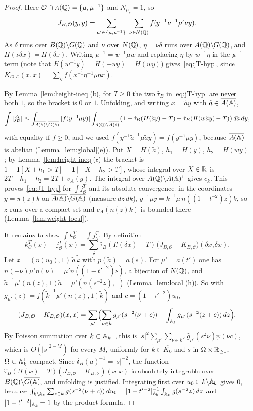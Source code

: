 \begin{proof}
Here $\mathcal O\cap A(\mathbb{Q})=\{\mu,\mu^{-1}\}$ and $N_{\mu_s}=1$, so
\[
J_{B,\mathcal O}(y,y)=\sum_{\mu'\in\{\mu,\mu^{-1}\}}\ \sum_{\nu\in N(\mathbb{Q})}
f(y^{-1}\nu^{-1}\mu'\nu y).
\] As $\delta$ runs over $B(\mathbb{Q})\backslash
G(\mathbb{Q})$ and $\nu$ over $N(\mathbb{Q})$, $\eta=\nu\delta$ runs over
$A(\mathbb{Q})\backslash G(\mathbb{Q})$, and $H(\nu\delta x)=H(\delta x)$. Writing
$\mu^{-1}=w^{-1}\mu w$ and replacing $\eta$ by $w^{-1}\eta$ in the
$\mu^{-1}$-term (note that $H(w^{-1}y)=H(-wy)=H(wy)$)
gives~\eqref{eq:jT-hyp}, since $K_{G,\mathcal O}(x,x)=\sum_{\eta}f(x^{-1}\eta^{-1}\mu\eta x)$.

By Lemma~\ref{lem:height-ineq}(b), for $T\ge0$ the two $\hat\tau_B$ in
\eqref{eq:jT-hyp} are never both $1$, so the bracket is $0$ or $1$.
Unfolding, and writing $x=\tilde a y$ with $\tilde a\in\overline{A(\mathbb{A})}$,
\[
\int|j^T_{\mathcal O}|\le\int_{\overline{A(\mathbb{A})}\backslash\overline{G(\mathbb{A})}}
|f(y^{-1}\mu y)|\int_{A(\mathbb{Q})\backslash\overline{A(\mathbb{A})}}
\bigl(1-\hat\tau_B(H(\tilde ay)-T)-\hat\tau_B(H(w\tilde ay)-T)\bigr)
\,d\tilde a\,dy,
\]
with equality if $f\ge0$, and we used $f(y^{-1}\tilde a^{-1}\mu\tilde
ay)=f(y^{-1}\mu y)$, because $\overline{A(\mathbb{A})}$ is abelian
(Lemma~\ref{lem:global}(e)). Put $X=H(\tilde a)$, $h_1=H(y)$, $h_2=
H(wy)$; by Lemma~\ref{lem:height-ineq}(c) the bracket is $1-\mathbf
1[X+h_1>T]-\mathbf 1[-X+h_2>T]$, whose integral over $X\in\mathbb{R}$ is
$2T-h_1-h_2=2T+v_A(y)$. The integral over $A(\mathbb{Q})\backslash A(\mathbb{A})^1$
gives $c_k$. This proves~\eqref{eq:JT-hyp} for $\int j^T_{\mathcal O}$
and its absolute convergence: in the coordinates $y=n(z)k$ on
$\overline{A(\mathbb{A})}\backslash\overline{G(\mathbb{A})}$ (measure $dz\,dk$), $y^{-1}\mu y=
k^{-1}\mu\,n((1-t^{-2})z)k$, so $z$ runs over a compact set and
$v_A(n(z)k)$ is bounded there (Lemma~\ref{lem:weight-local}).

It remains to show $\int k^T_{\mathcal O}=\int j^T_{\mathcal O}$. By
definition
\[
k^T_{\mathcal O}(x)-j^T_{\mathcal O}(x)=\sum_{\delta}
\hat\tau_B(H(\delta x)-T)\,\bigl(J_{B,\mathcal O}-K_{B,\mathcal O}\bigr)
(\delta x,\delta x).
\]
Let $x=(n(u_0),1)\,\tilde a\,\tilde k$ with $p(\tilde a)=a(s)$. For
$\mu'=a(t')$ one has $n(-\nu)\mu'n(\nu)=\mu'n((1-t'^{-2})\nu)$, a
bijection of $N(\mathbb{Q})$, and $\tilde a^{-1}\mu'(n(z),1)\tilde a=
\mu'(n(s^{-2}z),1)$ (Lemma~\ref{lem:local}(h)). So with
$g_{\mu'}(z)=f(\tilde k^{-1}\mu'(n(z),1)\tilde k)$ and $c=(1-t'^{-2})u_0$,
\[
(J_{B,\mathcal O}-K_{B,\mathcal O})(x,x)=\sum_{\mu'}\Bigl(\sum_{\nu\in k}
g_{\mu'}(s^{-2}(\nu+c))-\int_{\mathbb{A}_k}g_{\mu'}(s^{-2}(z+c))\,dz\Bigr).
\]
By Poisson summation over $k\subset\mathbb{A}_k$~\cite{Ta67}, this is
$|s|^2\sum_{\mu'}\sum_{\nu\in k^\times}\hat g_{\mu'}(s^2\nu)\psi(\nu c)$,
which is $O(|s|^{2-M})$ for every $M$, uniformly for $\tilde k\in
\overline{K_0}$ and $s$ in $\Omega\times\mathbb{R}_{\ge1}$, $\Omega\subset
\mathbb{A}_k^1$ compact. Since $\delta_B(a)^{-1}=|s|^{-2}$, the function
$\hat\tau_B(H(x)-T)(J_{B,\mathcal O}-K_{B,\mathcal O})(x,x)$ is
absolutely integrable over $B(\mathbb{Q})\backslash\overline{G(\mathbb{A})}$, and unfolding is
justified. Integrating first over $u_0\in k\backslash\mathbb{A}_k$ gives $0$,
because $\int_{k\backslash\mathbb{A}_k}\sum_{\nu\in k}g(s^{-2}(\nu+c))\,du_0=
|1-t'^{-2}|_{\mathbb{A}_k}^{-1}\int_{\mathbb{A}_k}g(s^{-2}z)\,dz$ and
$|1-t'^{-2}|_{\mathbb{A}_k}=1$ by the product formula.
\end{proof}

